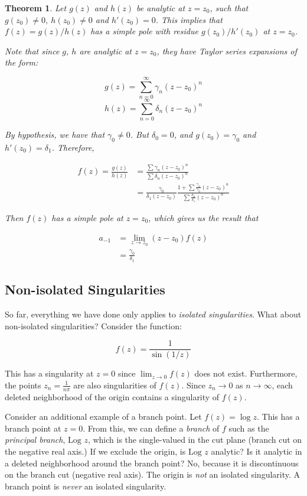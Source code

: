 \documentclass{article}
\newtheorem{theorem}{Theorem}[section]
\theoremstyle{definition}
\begin{document}
\begin{theorem}
Let $g(z)$ and $h(z)$ be analytic at $z=z_0$, such that $g(z_0) \neq 0,\ h(z_0) \neq 0$ and $h'(z_0) = 0$. This implies that $f(z) = g(z)/h(z)$ has a simple pole with residue $g(z_0)/h'(z_0)$ at $z=z_0$. 

Note that since $g$, $h$ are analytic at $z=z_0$, they have Taylor series expansions of the form:

$$g(z) = \sum_{n=0}^\infty \gamma_n (z-z_0)^n $$
$$h(z) = \sum_{n=0}^\infty \delta_n (z-z_0)^n $$


By hypothesis, we have that $\gamma_0 \neq 0$. But $\delta_0 = 0$, and $g(z_0) = \gamma_0$ and $h'(z_0) = \delta_1$. Therefore, 

\begin{align}
f(z) = \frac{g(z)}{h(z)} & = \frac{\sum\gamma_n (z-z_0)^n}{\sum\delta_n (z-z_0)^n} \\ 
& = \frac{\gamma_0}{\delta_1 (z-z_0)} \frac{1 + \sum\frac{\gamma_n}{\gamma_0} (z-z_0)^n}{\sum\frac{\delta_n}{\delta_1} (z-z_0)^n} 
\end{align}

Then $f(z)$ has a simple pole at $z=z_0$, which gives us the result that 

\begin{align}
a_{-1} &= \lim_{z \to z_0}(z-z_0) f(z) \\ 
& = \frac{\gamma_0}{\delta_1}
\end{align}
\end{theorem}

\subsection{Non-isolated Singularities }
So far, everything we have done only applies to \textit{isolated singularities}. What about non-isolated singularities? Consider the function:

$$f(z) = \frac{1}{\sin(1/z)}$$

This has a singularity at $z=0$ since $\lim_{z\to0} f(z)$ does not exist. Furthermore, the points $z_n = \frac{1}{n\pi}$ are also singularities of $f(z)$. Since $z_n \to 0$ as $n \to \infty$, each deleted neighborhood of the origin contains a singularity of $f(z)$. 


Consider an additional example of a branch point. Let $f(z) = \log z$. This has a branch point at $z=0$. From this, we can define a \textit{branch} of $f$ such as the \textit{principal branch}, $\text{Log } z$, which is the single-valued in the cut plane (branch cut on the negative real axis.) If we exclude the origin, is $\text{Log }z$ analytic? Is it analytic in a deleted neighborhood around the branch point? No, because it is discontinuous on the branch cut (negative real axis). The origin is \textit{not} an isolated singularity. A branch point is \textit{never} an isolated singularity.
\end{document}

